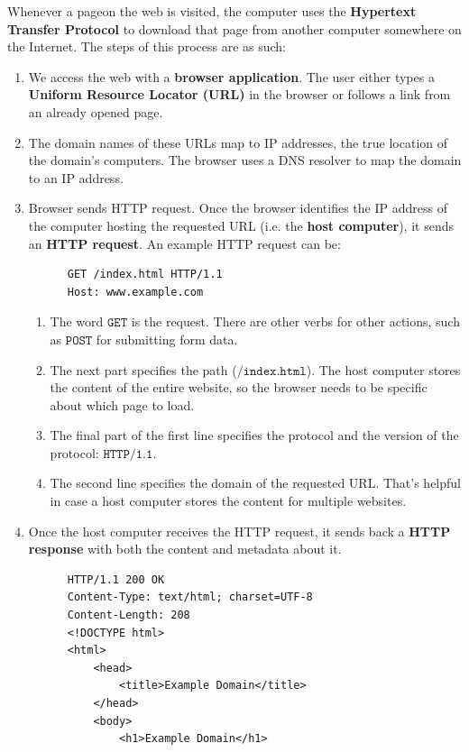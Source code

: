 \documentclass{article}
\begin{document}
  Whenever a pageon the web is visited, the computer uses the \textbf{Hypertext Transfer Protocol} to download that page from another computer somewhere on the Internet. The steps of this process are as such: 
  \begin{enumerate}
      \item We access the web with a \textbf{browser application}. The user either types a \textbf{Uniform Resource Locator (URL)} in the browser or follows a link from an already opened page. 
      \item The domain names of these URLs map to IP addresses, the true location of the domain's computers. The browser uses a DNS resolver to map the domain to an IP address. 
      \item Browser sends HTTP request. Once the browser identifies the IP address of the computer hosting the requested URL (i.e. the \textbf{host computer}), it sends an \textbf{HTTP request}. An example HTTP request can be: 
      \begin{lstlisting}
      GET /index.html HTTP/1.1
      Host: www.example.com
      \end{lstlisting}
      \begin{enumerate}
          \item The word $\texttt{GET}$ is the request. There are other verbs for other actions, such as $\texttt{POST}$ for submitting form data. 
          \item The next part specifies the path ($\texttt{/index.html}$). The host computer stores the content of the entire website, so the browser needs to be specific about which page to load.
          \item The final part of the first line specifies the protocol and the version of the protocol: $\texttt{HTTP/1.1}$. 
          \item The second line specifies the domain of the requested URL. That's helpful in case a host computer stores the content for multiple websites.
      \end{enumerate}
      \item Once the host computer receives the HTTP request, it sends back a \textbf{HTTP response} with both the content and metadata about it. 
      \begin{lstlisting}
      HTTP/1.1 200 OK
      Content-Type: text/html; charset=UTF-8
      Content-Length: 208
      <!DOCTYPE html>
      <html>
          <head>
              <title>Example Domain</title>
          </head>
          <body>
              <h1>Example Domain</h1>

\end{lstlisting}
\end{enumerate}
\end{document}
